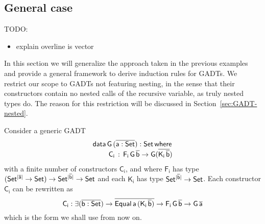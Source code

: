 \documentclass[acmsmall,screen,review,anonymous]{acmart}
\theoremstyle{definition}
\begin{document}

\subsection{General case}


TODO:
\begin{itemize}
\item explain overline is vector
\end{itemize}

In this section we will generalize the approach taken in the previous examples
and provide a general framework to derive induction rules for GADTs.
We restrict our scope to GADTs not featuring nesting,
in the sense that their constructors contain no nested calls of the recursive variable,
as truly nested types do.
The reason for this restriction will be discussed in Section~\ref{sec:GADT-nested}.

Consider a generic GADT
\begin{equation}\label{eq:gadt}
\begin{array}{l}
\mathsf{data\, G\,(\overline{a : Set}) : Set\,where}\\
\mathsf{\;\;\;\;\;\;\;\;C_i\, :\, F_i\,G\,\overline{b} \to G (\overline{K_i\,\overline{b}})}
\end{array}
\end{equation}
with a finite number of constructors $\mathsf{C_i}$,
and where $\mathsf{F_i}$ has type $\mathsf{(Set^{\lvert\overline{a}\rvert} \to Set) \to Set^{\lvert\overline{b}\rvert} \to Set}$
and each $\mathsf{K_i}$ has type $\mathsf{Set^{\lvert\overline{b}\rvert} \to Set}$.
Each constructor $\mathsf{C_i}$ can be rewritten as
\[
\mathsf{C_i : \exists (\overline{b : Set}) \to \overline{Equal\,a\,(K_i\,\overline{b})} \to F_i\,G\,\overline{b} \to G\,\overline{a}}
\]
which is the form we shall use from now on.
\end{document}
